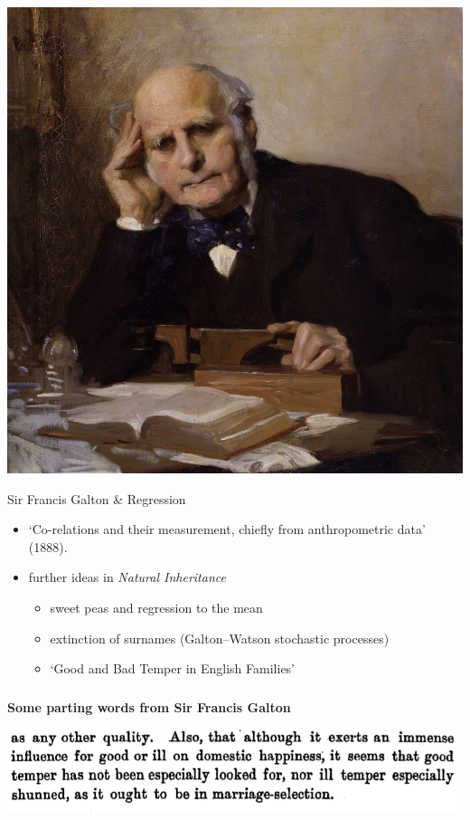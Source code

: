 \begin{frame}[fragile] \frametitle{}

\noindent
\begin{minipage}{0.35\textwidth}
\includegraphics[width=0.75\linewidth]{img/Sir_Francis_Galton_by_Charles_Wellington_Furse.jpg}
\end{minipage}%
\begin{minipage}{0.65\textwidth}
Sir Francis Galton \& Regression \\
\begin{itemize}
\item `Co-relations and their measurement, chiefly from anthropometric data' (1888).
\item further ideas in {\it Natural Inheritance}
\begin{itemize}
\item sweet peas and regression to the mean
\item extinction of surnames (Galton–Watson stochastic processes)
\item `Good and Bad Temper in English Families'
\end{itemize}
\end{itemize}
\end{minipage}

\end{frame}


\begin{frame}[fragile] \frametitle{}

{\bf Some parting words from Sir Francis Galton}

\begin{center}
\includegraphics[width=0.95\linewidth]{img/galton_quote.png}
\end{center}

\end{frame}















